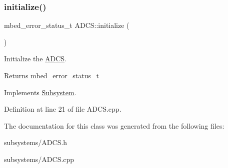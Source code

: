 \subsubsection{\texorpdfstring{initialize()}{initialize()}}
{\footnotesize\ttfamily mbed\+\_\+error\+\_\+status\+\_\+t A\+D\+C\+S\+::initialize (\begin{DoxyParamCaption}{ }\end{DoxyParamCaption})\hspace{0.3cm}{\ttfamily [virtual]}}



Initialize the \mbox{\hyperlink{class_a_d_c_s}{A\+D\+CS}}. 

\begin{DoxyReturn}{Returns}
mbed\+\_\+error\+\_\+status\+\_\+t 
\end{DoxyReturn}


Implements \mbox{\hyperlink{class_subsystem_afa43e7c1c8b49e514b944f517d4dc905}{Subsystem}}.



Definition at line 21 of file A\+D\+C\+S.\+cpp.



The documentation for this class was generated from the following files\+:\begin{DoxyCompactItemize}
\item 
subsystems/A\+D\+C\+S.\+h\item 
subsystems/A\+D\+C\+S.\+cpp\end{DoxyCompactItemize}
